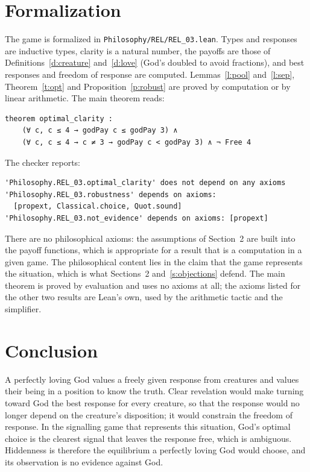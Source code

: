 \documentclass{situationist-preprint}
\begin{document}
\section{Formalization}

The game is formalized in \nolinkurl{Philosophy/REL/REL_03.lean}. Types and responses are inductive types, clarity is a natural number, the payoffs are those of Definitions~\ref{d:creature} and~\ref{d:love} (God's doubled to avoid fractions), and best responses and freedom of response are computed. Lemmas~\ref{l:pool} and~\ref{l:sep}, Theorem~\ref{t:opt} and Proposition~\ref{p:robust} are proved by computation or by linear arithmetic. The main theorem reads:

\begin{lstlisting}
theorem optimal_clarity :
    (∀ c, c ≤ 4 → godPay c ≤ godPay 3) ∧
    (∀ c, c ≤ 4 → c ≠ 3 → godPay c < godPay 3) ∧ ¬ Free 4
\end{lstlisting}

The checker reports:

\begin{lstlisting}
'Philosophy.REL_03.optimal_clarity' does not depend on any axioms
'Philosophy.REL_03.robustness' depends on axioms:
  [propext, Classical.choice, Quot.sound]
'Philosophy.REL_03.not_evidence' depends on axioms: [propext]
\end{lstlisting}

There are no philosophical axioms: the assumptions of Section~2 are built into the payoff functions, which is appropriate for a result that is a computation in a given game. The philosophical content lies in the claim that the game represents the situation, which is what Sections~2 and~\ref{s:objections} defend. The main theorem is proved by evaluation and uses no axioms at all; the axioms listed for the other two results are Lean's own, used by the arithmetic tactic and the simplifier.

\section{Conclusion}

A perfectly loving God values a freely given response from creatures and values their being in a position to know the truth. Clear revelation would make turning toward God the best response for every creature, so that the response would no longer depend on the creature's disposition; it would constrain the freedom of response. In the signalling game that represents this situation, God's optimal choice is the clearest signal that leaves the response free, which is ambiguous. Hiddenness is therefore the equilibrium a perfectly loving God would choose, and its observation is no evidence against God.
\end{document}
